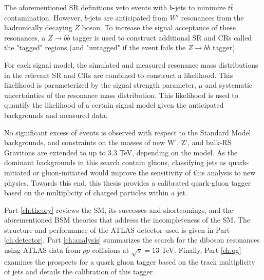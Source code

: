 The aforementioned SR definitions veto events with $b$-jets to minimize $t\bar{t}$ contamination. However, $b$-jets are anticipated from $W'$ resonances from the hadronically decaying $Z$ boson. To increase the signal acceptance of these resonances, a $Z\rightarrow bb$ tagger is used to construct additional SR and CRs called the "tagged" regions (and "untagged" if the event fails the $Z\rightarrow bb$ tagger). 

For each signal model, the simulated and measured resonance mass distributions in the relevant SR and CRs are combined to construct a likelihood. This likelihood is parameterized by the signal strength parameter, $\mu$ and systematic uncertainties of the resonance mass distribution. This likelihood is used to quantify the likelihood of a certain signal model given the anticipated backgrounds and measured data.

No significant excess of events is observed with respect to the Standard Model backgrounds, and constraints on the masses of new W', Z', and bulk-RS Gravitons are extended to up to 3.3 TeV, depending on the model. As the dominant backgrounds in this search contain gluons, classifying jets as quark-initiated or gluon-initiated would improve the sensitivity of this analysis to new physics. Towards this end, this thesis provides a calibrated quark-gluon tagger based on the multiplicity of charged particles within a jet.

Part \ref{ch:theory} reviews the SM, its successes and shortcomings, and the aforementioned BSM theories that address the incompleteness of the SM. The structure and performance of the ATLAS detector used is given in Part \ref{ch:detector}. Part \ref{ch:analysis} summarizes the search for the diboson resonances using ATLAS data from $pp$ collisions at $\sqrt{s}=13$ TeV. Finally, Part \ref{ch:qg} examines the prospects for a quark gluon tagger based on the track multiplicity of jets and details the calibration of this tagger.